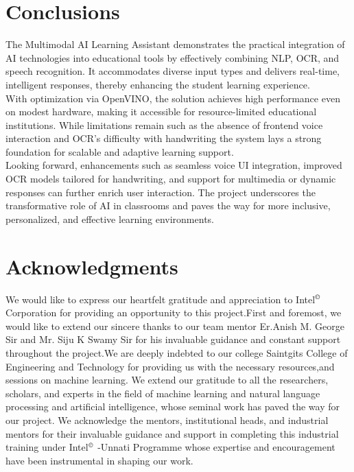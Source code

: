\documentclass{josis}
\begin{document}
\newpage
\section{Conclusions}
The Multimodal AI Learning Assistant demonstrates the practical integration of AI technologies into educational tools by effectively combining NLP, OCR, and speech recognition. It accommodates diverse input types and delivers real-time, intelligent responses, thereby enhancing the student learning experience.\\
With optimization via OpenVINO, the solution achieves high performance even on modest hardware, making it accessible for resource-limited educational institutions. While limitations remain such as the absence of frontend voice interaction and OCR's difficulty with handwriting the system lays a strong foundation for scalable and adaptive learning support.\\
Looking forward, enhancements such as seamless voice UI integration, improved OCR models tailored for handwriting, and support for multimedia or dynamic responses can further enrich user interaction. The project underscores the transformative role of AI in classrooms and paves the way for more inclusive, personalized, and effective learning environments.

\section*{Acknowledgments}
We would like to express our heartfelt gratitude and appreciation to Intel$^\copyright$ Corporation for providing an opportunity to this project.First and foremost, we would like to extend our sincere thanks to our team mentor Er.Anish M. George Sir and Mr. Siju K Swamy Sir for his invaluable guidance and constant support throughout the project.We are deeply indebted to our college Saintgits College of Engineering and Technology for providing us with the necessary resources,and sessions on machine learning. We extend our gratitude to all the researchers, scholars, and experts in the field of machine learning and natural language processing and artificial intelligence, whose seminal work has paved the way for our project. We acknowledge the mentors, institutional heads, and industrial mentors for their invaluable guidance and support in completing this industrial training under Intel$^\copyright$ -Unnati Programme whose expertise and encouragement have been instrumental in shaping our work.
\end{document}
